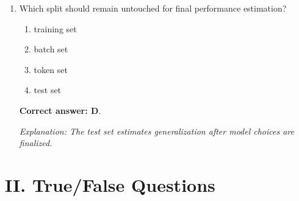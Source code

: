 \documentclass[10pt,a4paper]{article}
\newcommand{\ans}[1]{\par\textbf{Correct answer: #1}}
\newcommand{\expn}[1]{\par\textit{Explanation: #1}}
\begin{document}
\begin{enumerate}[label=\textbf{\arabic*.},itemsep=4pt]
\ans{C}. \expn{AUC summarizes discrimination across classification thresholds.}
\item Which split should remain untouched for final performance estimation?
\begin{enumerate}[label=\Alph*.,itemsep=0pt]\item training set\item batch set\item token set\item test set\end{enumerate}
\ans{D}. \expn{The test set estimates generalization after model choices are finalized.}
\end{enumerate}

\section*{II. True/False Questions}
\end{document}
